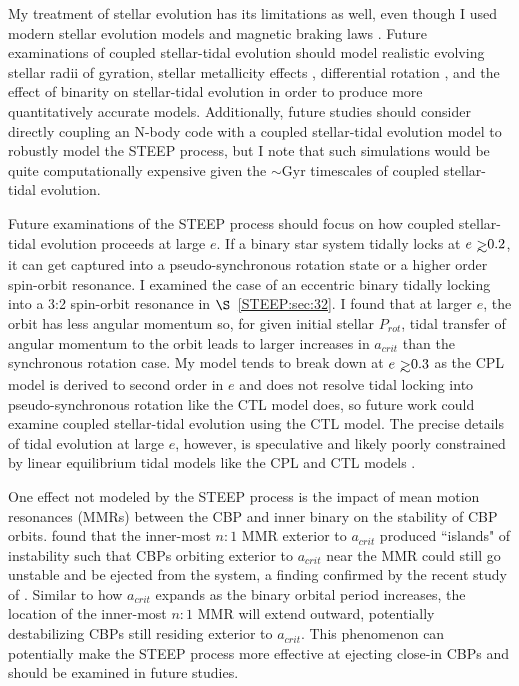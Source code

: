 My treatment of stellar evolution has its limitations as well, even though I used modern stellar evolution models \citep{Baraffe2015} and magnetic braking laws \citep{Reiners2012,Repetto2014}.  Future examinations of coupled stellar-tidal evolution should model realistic evolving stellar radii of gyration, stellar metallicity effects \citep[e.g.][]{Bolmont2017}, differential rotation \citep[e.g.][]{Lanza2016}, and the effect of binarity on stellar-tidal evolution in order to produce more quantitatively accurate models.  Additionally, future studies should consider directly coupling an N-body code with a coupled stellar-tidal evolution model to robustly model the STEEP process, but I note that such simulations would be quite computationally expensive given the ${\sim}$Gyr timescales of coupled stellar-tidal evolution.

Future examinations of the STEEP process should focus on how coupled stellar-tidal evolution proceeds at large $e$.  If a binary star system tidally locks at $e \gsim 0.2$, it can get captured into a pseudo-synchronous rotation state or a higher order spin-orbit resonance.  I examined the case of an eccentric binary tidally locking into a 3:2 spin-orbit resonance in $\S$~\ref{STEEP:sec:32}.  I found that at larger $e$, the orbit has less angular momentum so, for given initial stellar $P_{rot}$, tidal transfer of angular momentum to the orbit leads to larger increases in $a_{crit}$ than the synchronous rotation case.  My model tends to break down at $e \gsim 0.3$ as the CPL model is derived to second order in $e$ and does not resolve tidal locking into pseudo-synchronous rotation like the CTL model does, so future work could examine coupled stellar-tidal evolution using the CTL model.  The precise details of tidal evolution at large $e$, however, is speculative and likely poorly constrained by linear equilibrium tidal models like the CPL and CTL models \citep[e.g.][]{FerrazMello2008,Greenberg2009}.

One effect not modeled by the STEEP process is the impact of mean motion resonances (MMRs) between the CBP and inner binary on the stability of CBP orbits.  \citet{Holman1999} found that the inner-most $n:1$ MMR exterior to $a_{crit}$ produced ``islands" of instability such that CBPs orbiting exterior to $a_{crit}$ near the MMR could still go unstable and be ejected from the system, a finding confirmed by the recent study of \citet{Lam2018}.  Similar to how $a_{crit}$ expands as the binary orbital period increases, the location of the inner-most $n:1$ MMR will extend outward, potentially destabilizing CBPs still residing exterior to $a_{crit}$.  This phenomenon can potentially make the STEEP process more effective at ejecting close-in CBPs and should be examined in future studies.


